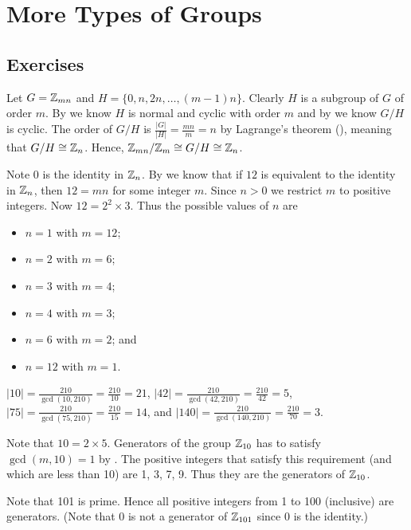 \section{More Types of Groups}
\subsection*{Exercises}
\begin{questions}
    \item Let $G = \mathbb{Z}_{mn}$ and $H = \{0, n, 2n, \dots, (m-1)n\}$. Clearly $H$ is a subgroup of $G$ of order $m$. By  we know $H$ is normal and cyclic with order $m$ and by  we know $G/H$ is cyclic. The order of $G/H$ is $\frac{|G|}{|H|} = \frac{mn}{m} = n$ by Lagrange's theorem (), meaning that $G/H \cong \mathbb{Z}_n$. Hence, $\mathbb{Z}_{mn}/\mathbb{Z}_m \cong G/H \cong \mathbb{Z}_n$.

    \item Note 0 is the identity in $\mathbb{Z}_n$. By  we know that if $12$ is equivalent to the identity in $\mathbb{Z}_n$, then $12 = mn$ for some integer $m$. Since $n > 0$ we restrict $m$ to positive integers. Now $12 = 2^2 \times 3$. Thus the possible values of $n$ are
    \begin{itemize}
        \item $n = 1$ with $m = 12$;
        \item $n = 2$ with $m = 6$;
        \item $n = 3$ with $m = 4$;
        \item $n = 4$ with $m = 3$;
        \item $n = 6$ with $m = 2$; and
        \item $n = 12$ with $m = 1$.
    \end{itemize}

    \item $|10| = \frac{210}{\gcd(10, 210)} = \frac{210}{10} = 21$, $|42| = \frac{210}{\gcd(42, 210)} = \frac{210}{42} = 5$, $|75| = \frac{210}{\gcd(75, 210)} = \frac{210}{15} = 14$, and $|140| = \frac{210}{\gcd(140, 210)} = \frac{210}{70} = 3$.

    \item \begin{partquestions}{\alph*}
        \item Note that $10 = 2 \times 5$. Generators of the group $\mathbb{Z}_{10}$ has to satisfy $\gcd(m, 10) = 1$ by . The positive integers that satisfy this requirement (and which are less than 10) are 1, 3, 7, 9. Thus they are the generators of $\mathbb{Z}_{10}$.
        \item Note that 101 is prime. Hence all positive integers from 1 to 100 (inclusive) are generators. (Note that 0 is not a generator of $\mathbb{Z}_{101}$ since 0 is the identity.)
    \end{partquestions}


\end{questions}
